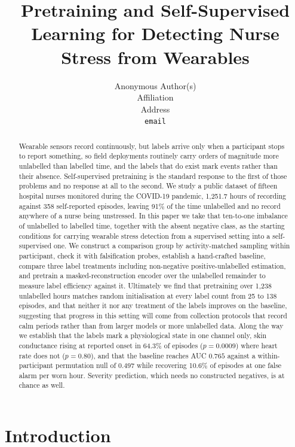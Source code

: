 \documentclass{article}
\title{Pretraining and Self-Supervised Learning for Detecting
Nurse Stress from Wearables}
\author{%
  Anonymous Author(s) \\
  Affiliation \\
  Address \\
  \texttt{email} \\
}
\begin{document}
\maketitle

\begin{abstract}
Wearable sensors record continuously, but labels arrive only when a participant
stops to report something, so field deployments routinely carry orders of
magnitude more unlabelled than labelled time, and the labels that do exist
mark events rather than their absence. Self-supervised pretraining is the
standard response to the first of those problems and no response at all to
the second. We study a public dataset of fifteen
hospital nurses monitored during the COVID-19 pandemic, 1{,}251.7 hours of
recording against 358 self-reported episodes, leaving 91\% of the time
unlabelled and no record anywhere of a nurse being unstressed. In this paper we
take that ten-to-one imbalance of unlabelled to labelled time, together with
the absent negative class, as the starting conditions for carrying wearable
stress detection from a supervised setting into a self-supervised one. We
construct a comparison group by activity-matched sampling within participant,
check it with falsification probes, establish a hand-crafted baseline, compare
three label treatments including non-negative positive-unlabelled estimation,
and pretrain a masked-reconstruction encoder over the unlabelled remainder to
measure label efficiency against it. Ultimately we find that pretraining over
1,238 unlabelled hours matches random initialisation at every label count from
25 to 138 episodes, and that neither it nor any treatment of the labels
improves on the baseline, suggesting that progress in this setting will come
from collection protocols that record calm periods rather than from larger
models or more unlabelled data. Along the way we establish that the labels mark
a physiological state in one channel only, skin conductance rising at reported
onset in 64.3\% of episodes ($p=0.0009$) where heart rate does not
($p=0.80$), and that the baseline reaches AUC $0.765$ against a
within-participant permutation null of $0.497$ while recovering 10.6\% of
episodes at one false alarm per worn hour. Severity prediction, which needs no
constructed negatives, is at chance as well.
\end{abstract}

\section{Introduction}
\end{document}
